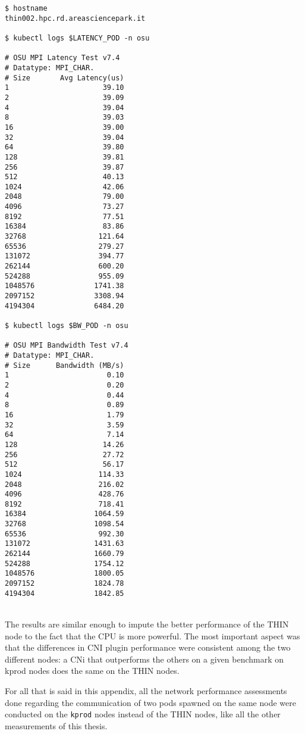 \begin{minipage}[t]{0.48\textwidth}
\begin{verbatim}
$ hostname
thin002.hpc.rd.areasciencepark.it

$ kubectl logs $LATENCY_POD -n osu

# OSU MPI Latency Test v7.4
# Datatype: MPI_CHAR.
# Size       Avg Latency(us)
1                      39.10
2                      39.09
4                      39.04
8                      39.03
16                     39.00
32                     39.04
64                     39.80
128                    39.81
256                    39.87
512                    40.13
1024                   42.06
2048                   79.00
4096                   73.27
8192                   77.51
16384                  83.86
32768                 121.64
65536                 279.27
131072                394.77
262144                600.20
524288                955.09
1048576              1741.38
2097152              3308.94
4194304              6484.20

$ kubectl logs $BW_POD -n osu

# OSU MPI Bandwidth Test v7.4
# Datatype: MPI_CHAR.
# Size      Bandwidth (MB/s)
1                       0.10
2                       0.20
4                       0.44
8                       0.89
16                      1.79
32                      3.59
64                      7.14
128                    14.26
256                    27.72
512                    56.17
1024                  114.33
2048                  216.02
4096                  428.76
8192                  718.41
16384                1064.59
32768                1098.54
65536                 992.30
131072               1431.63
262144               1660.79
524288               1754.12
1048576              1800.05
2097152              1824.78
4194304              1842.85
\end{verbatim}
\end{minipage}
\\

The results are similar enough to impute the better performance of the THIN node
to the fact that the CPU is more powerful. The most important aspect was that
the differences in CNI plugin performance were consistent among the two
different nodes: a CNi that outperforms the others on a given benchmark on kprod
nodes does the same on the THIN nodes.

For all that is said in this appendix, all the network performance assessments
done regarding the communication of two pods spawned on the same node were
conducted on the \texttt{kprod} nodes instead of the THIN nodes, like all the
other measurements of this thesis.
